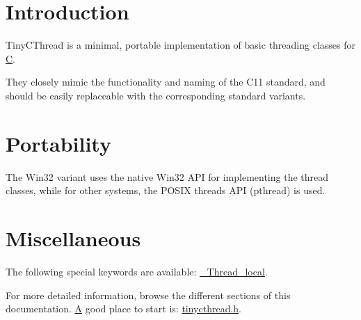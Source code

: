\hypertarget{index_intro_sec}{}\section{Introduction}\label{index_intro_sec}
Tiny\+C\+Thread is a minimal, portable implementation of basic threading classes for \hyperlink{classC}{C}.

They closely mimic the functionality and naming of the C11 standard, and should be easily replaceable with the corresponding standard variants.\hypertarget{index_port_sec}{}\section{Portability}\label{index_port_sec}
The Win32 variant uses the native Win32 A\+P\+I for implementing the thread classes, while for other systems, the P\+O\+S\+I\+X threads A\+P\+I (pthread) is used.\hypertarget{index_misc_sec}{}\section{Miscellaneous}\label{index_misc_sec}
The following special keywords are available\+: \hyperlink{tinycthread_8h_a6ee13d5bcebab292dbc98e06c6cf9fe7}{\+\_\+\+Thread\+\_\+local}.

For more detailed information, browse the different sections of this documentation. \hyperlink{structA}{A} good place to start is\+: \hyperlink{tinycthread_8h}{tinycthread.\+h}. 